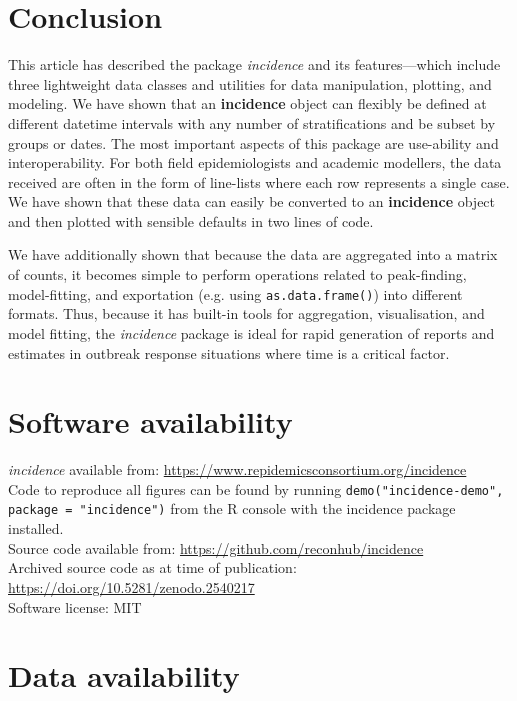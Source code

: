 \documentclass[9pt,a4paper]{extarticle}
\begin{document}
\section*{Conclusion} 

This article has described the package \textit{incidence} and its features---which include three lightweight data classes and utilities for data manipulation, plotting, and modeling.
We have shown that an \textbf{incidence} object can flexibly be defined at different datetime intervals with any number of stratifications and be subset by groups or dates. 
The most important aspects of this package are use-ability and interoperability.
For both field epidemiologists and academic modellers, the data received are often in the form of line-lists where each row represents a single case.
We have shown that these data can easily be converted to an \textbf{incidence} object and then plotted with sensible defaults in two lines of code.

We have additionally shown that because the data are aggregated into a matrix of counts, it becomes simple to perform operations related to peak-finding, model-fitting, and exportation (e.g. using \texttt{as.data.frame()}) into different formats.
Thus, because it has built-in tools for aggregation, visualisation, and model fitting, the \textit{incidence} package is ideal for rapid generation of reports and estimates in outbreak response situations where time is a critical factor.


\section*{Software availability}
\textit{incidence} available from: \url{https://www.repidemicsconsortium.org/incidence}\\
Code to reproduce all figures can be found by running \texttt{demo("incidence-demo", package = "incidence")} from the R console with the incidence package installed.\\
Source code available from: \url{https://github.com/reconhub/incidence}\\
Archived source code as at time of publication: \url{https://doi.org/10.5281/zenodo.2540217}\\
Software license: MIT

\section*{Data availability}
\end{document}
